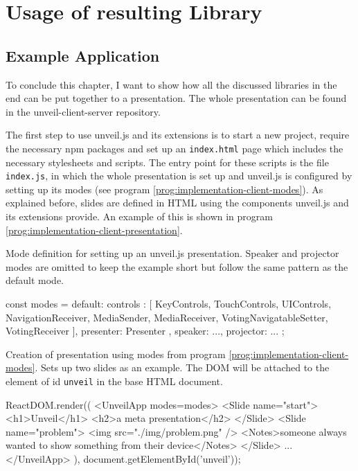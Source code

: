 \chapter{Usage of resulting Library}
\label{cha:usage}

\section{Example Application}
\label{sec:implementation-client}

To conclude this chapter, I want to show how all the discussed libraries in the end can be put together to a presentation. The whole presentation can be found in the unveil-client-server repository.

The first step to use unveil.js and its extensions is to start a new project, require the necessary npm packages and set up an \texttt{index.html} page which includes the necessary stylesheets and scripts.
The entry point for these scripts is the file \texttt{index.js}, in which the whole presentation is set up and unveil.js is configured by setting up its modes (see program \ref{prog:implementation-client-modes}). As explained before, slides are defined in HTML using the components unveil.js and its extensions provide. An example of this is shown in program \ref{prog:implementation-client-presentation}.

\begin{program}
\caption{Mode definition for setting up an unveil.js presentation. Speaker and projector modes are omitted to keep the example short but follow the same pattern as the default mode.}
\label{prog:implementation-client-modes}
\begin{JsCode}
const modes = {
  default: {
    controls : [
      KeyControls, TouchControls, UIControls,
      NavigationReceiver,
      MediaSender, MediaReceiver,
      VotingNavigatableSetter, VotingReceiver
    ],
    presenter: Presenter
  },
  speaker: {...},
  projector: {...}
};
\end{JsCode}
\end{program}

\begin{program}
\caption{Creation of presentation using modes from program \ref{prog:implementation-client-modes}. Sets up two slides as an example. The DOM will be attached to the element of id \texttt{unveil} in the base HTML document.}
\label{prog:implementation-client-presentation}
\begin{JsCode}
ReactDOM.render((
  <UnveilApp modes={modes}>
    <Slide name="start">
      <h1>Unveil</h1>
      <h2>a meta presentation</h2>
    </Slide>
    <Slide name="problem">
      <img src="./img/problem.png" />
      <Notes>someone always wanted to show something from their device</Notes>
    </Slide>
    ...
  </UnveilApp>
), document.getElementById('unveil'));
\end{JsCode}
\end{program}

